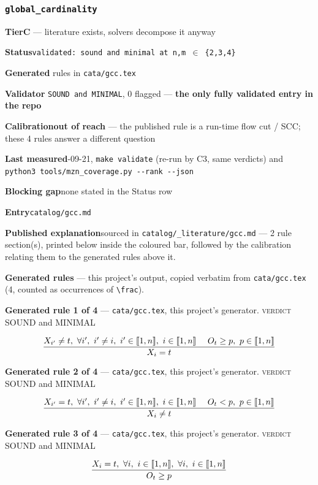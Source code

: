 \documentclass[10pt,a4paper]{article}
\newcommand{\entryfield}[2]{{\raggedright\textbf{#1}\quad #2\par}}
\newcommand{\rulebox}[1]{%
  \[\resizebox{\ifdim\width>\linewidth\linewidth\else\width\fi}{!}%
    {$\displaystyle #1$}\]}
\begin{document}
\subsubsection*{\texttt{global\_\allowbreak{}cardinality}}
\label{entry:gcc}
\entryfield{Tier}{\textbf{C} --- literature exists, solvers decompose it anyway}
\entryfield{Status}{\texttt{validated: sound and minimal at n,m $\in$ \{2,3,4\}}}
\entryfield{Generated}{4 rules in \texttt{cata/gcc.tex}}
\entryfield{Validator}{4 \texttt{SOUND and MINIMAL}, 0 flagged --- \textbf{the only fully validated entry in the repo}}
\entryfield{Calibration}{\textbf{out of reach} --- the published rule is a run-time flow cut / SCC; these 4 rules answer a different question}
\entryfield{Last measured}{2026-09-21, \texttt{make validate} (re-run by C3, same verdicts) and \texttt{python3 tools/\allowbreak{}mzn\_\allowbreak{}coverage.\allowbreak{}py -\allowbreak{}-\allowbreak{}rank -\allowbreak{}-\allowbreak{}json}}
\entryfield{Blocking gap}{none stated in the Status row}
\entryfield{Entry}{\texttt{catalog/gcc.md}}
\entryfield{Published explanation}{sourced in \texttt{catalog/\_\allowbreak{}literature/gcc.md} --- 2 rule section(s), printed below inside the coloured bar, followed by the calibration relating them to the generated rules above it.}

\textbf{Generated rules} --- this project's output, copied verbatim from \texttt{cata/gcc.tex} (4, counted as occurrences of \texttt{\textbackslash{}frac}).\par

{\small\textbf{Generated rule 1 of 4} --- \texttt{cata/gcc.tex}, this project's generator. \textsc{verdict} SOUND and MINIMAL\par}
\rulebox{\frac{X_{i'} \neq t,~\forall i',~i' \neq i,~i' \in \llbracket1,n\rrbracket,~i \in \llbracket1,n\rrbracket~~~~O_{t} \geq p,~p \in \llbracket1,n\rrbracket}{X_{i}=t}}

{\small\textbf{Generated rule 2 of 4} --- \texttt{cata/gcc.tex}, this project's generator. \textsc{verdict} SOUND and MINIMAL\par}
\rulebox{\frac{X_{i'}=t,~\forall i',~i' \neq i,~i' \in \llbracket1,n\rrbracket,~i \in \llbracket1,n\rrbracket~~~~O_{t}<p,~p \in \llbracket1,n\rrbracket}{X_{i} \neq t}}

{\small\textbf{Generated rule 3 of 4} --- \texttt{cata/gcc.tex}, this project's generator. \textsc{verdict} SOUND and MINIMAL\par}
\rulebox{\frac{X_{i}=t,~\forall i,~i \in \llbracket1,n\rrbracket,~\forall i,~i \in \llbracket1,n\rrbracket}{O_{t} \geq p}}
\end{document}
